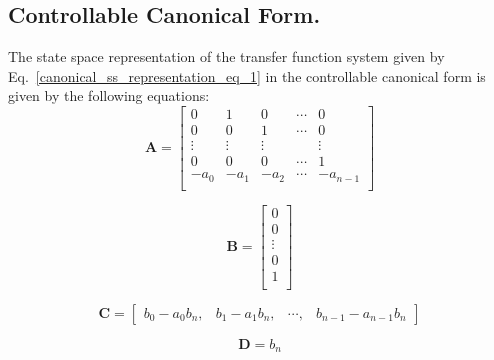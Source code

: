 \documentclass[11pt,a4paper,oneside]{book}
\numberwithin{equation}{section}
\theoremstyle{it}
\theoremstyle{definition}
\begin{document}
\subsection{Controllable Canonical Form.} \begin{mybox} The state space 
representation of the 
transfer function system given by Eq.~\eqref{canonical_ss_representation_eq_1} 
in the controllable canonical 
form is given by the following equations:
\begin{equation}\label{ccanonical_form_eq1}
	\mathbf{A} = \left[ \begin{matrix}
		0 & 1 & 0 & \cdots & 0 \\
		0 & 0 & 1 & \cdots & 0 \\
		\vdots & \vdots & \vdots &  & \vdots \\
		0 & 0 & 0 & \cdots & 1 \\
		-a_0 & -a_1 & -a_2 & \cdots & -a_{n-1} \\
	\end{matrix}\right] 
\end{equation}

\begin{equation}\label{ccanonical_form_eq2}
	\mathbf{B} = \left[ \begin{matrix}
		0  \\
		0  \\
		\vdots \\
		0  \\
		1  \\
	\end{matrix}\right] 
\end{equation}

\begin{equation}\label{ccanonical_form_eq3}
	\mathbf{C} = \left[ \begin{matrix}
		b_0-a_0b_n, & b_1-a_1b_n, & \cdots, & b_{n-1}-a_{n-1}b_n
	\end{matrix}\right] 
\end{equation}

\begin{equation}\label{ccanonical_form_eq4}
	\mathbf{D} = b_n 
\end{equation}
\end{mybox}
\end{document}
